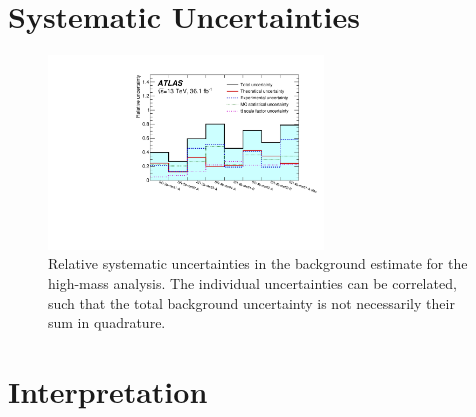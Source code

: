 \section{Systematic Uncertainties}

\begin{figure}[htbp]
	\centering
	\includegraphics[width=0.65\textwidth]{figures/ewk_prod/etmiss_misc/High-MET-syst.pdf}
	\caption{Relative systematic uncertainties in the background estimate for the high-mass analysis. The individual uncertainties can be correlated, such that the total background uncertainty is not necessarily their sum in quadrature. 
	} 
	\label{fig:syst_etmiss}
\end{figure}

\clearpage

\section{Interpretation}

